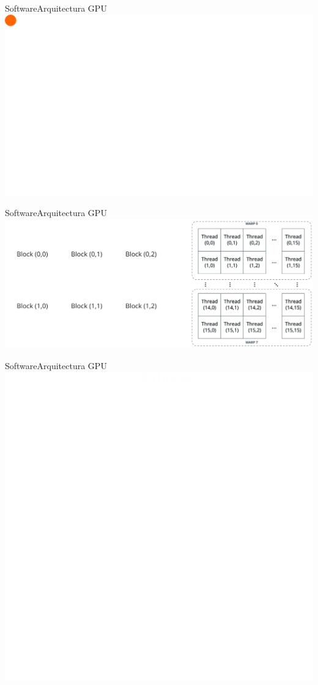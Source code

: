 \begin{frame}{Software}{Arquitectura GPU}
	\centering
	\includegraphics[width=0.6\paperwidth]{gfx/cores}
\end{frame}

\begin{frame}{Software}{Arquitectura GPU}
	\centering
	\includegraphics[width=0.9\paperwidth]{gfx/cudagrid}
\end{frame}

\begin{frame}{Software}{Arquitectura GPU}
\centering
\includegraphics[height=0.7\paperheight]{gfx/owncudagrid}
\end{frame}

